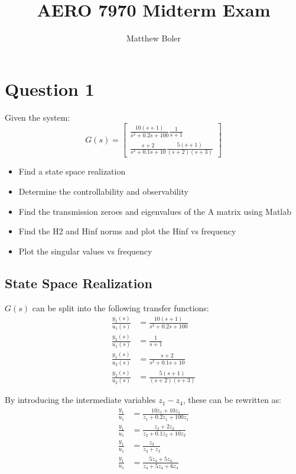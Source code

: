 \documentclass[]{article}
\title{AERO 7970 Midterm Exam}
\author{Matthew Boler}
\begin{document}
\maketitle


\section{Question 1}
Given the system:
\begin{equation}
	G(s) = \begin{bmatrix}
	\frac{10(s+1)}{s^2 + 0.2s + 100} \frac{1}{s+1} \\
	\frac{s+2}{s^2 + 0.1s + 10} \frac{5(s+1)}{(s+2)(s+3)}
	\end{bmatrix}
\end{equation}

\begin{itemize}
	\item Find a state space realization
	\item Determine the controllability and observability
	\item Find the transmission zeroes and eigenvalues of the A matrix using Matlab
	\item Find the H2 and Hinf norms and plot the Hinf vs frequency
	\item Plot the singular values vs frequency
\end{itemize}

\subsection{State Space Realization}
\noindent $G(s)$ can be split into the following transfer functions:
\begin{align}
	\frac{y_1(s)}{u_1(s)} &= \frac{10(s+1)}{s^2 + 0.2s + 100}\\
	\frac{y_2(s)}{u_1(s)} &= \frac{1}{s+1} \\
	\frac{y_1(s)}{u_2(s)} &= \frac{s+2}{s^2 + 0.1s + 10} \\
	\frac{y_2(s)}{u_2(s)} &= \frac{5(s+1)}{(s+2)(s+3)}
\end{align}

\noindent By introducing the intermediate variables $z_1 - z_4$, these can be rewritten as:
\begin{align}
	\frac{y_1}{u_1} &= \frac{10\dot{z}_1 + 10 z_1}{\ddot{z}_1 + 0.2\dot{z}_1 + 100z_1} \\
	\frac{y_1}{u_1} &= \frac{\dot{z}_2 + 2z_2}{\ddot{z}_2 + 0.1\dot{z}_2 + 10z_2} \\
	\frac{y_1}{u_1} &= \frac{z_3}{\dot{z}_3 + z_3} \\
	\frac{y_1}{u_1} &= \frac{5\dot{z}_4 + 5z_4}{\ddot{z}_4 + 5\dot{z}_4 + 6z_4}
\end{align}
\end{document}
